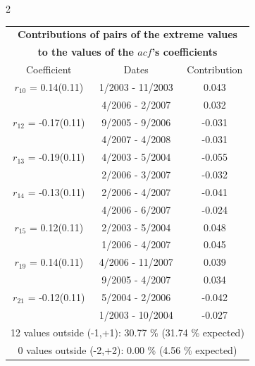 
\thispagestyle{empty}
\begin{multicols}{2}{ 
\begin{tabular}{ccc}
\multicolumn{3}{c}{\textbf{Contributions of pairs of the extreme values} }  \vspace{-.10in}  \\ 
\multicolumn{3}{c}{ \textbf{to the values of the $acf$'s coefficients}} \\ 
\hline 
\hline                  Coefficient  &  Dates &  Contribution \\ 
\hline 
  $r_{10}$ = 0.14(0.11) &       1/2003 - 11/2003 &        0.043   \vspace{-.10in} \\  
&        4/2006 -  2/2007 &        0.032  \vspace{-.02in} \\ \hline 
  $r_{12}$ = -0.17(0.11) &       9/2005 -  9/2006 &       -0.031    \vspace{-.10in} \\ 
  &        4/2007 -  4/2008 &       -0.031  \vspace{-.02in}   \\ \hline 
    $r_{13}$ = -0.19(0.11) &       4/2003 -  5/2004 &       -0.055    \vspace{-.10in} \\ 
  &        2/2006 -  3/2007 &       -0.032  \vspace{-.02in}   \\ \hline 
    $r_{14}$ = -0.13(0.11) &       2/2006 -  4/2007 &       -0.041    \vspace{-.10in} \\ 
  &        4/2006 -  6/2007 &       -0.024  \vspace{-.02in}   \\ \hline 
    $r_{15}$ = 0.12(0.11) &       2/2003 -  5/2004 &        0.048   \vspace{-.10in} \\  
&        1/2006 -  4/2007 &        0.045  \vspace{-.02in} \\ \hline 
  $r_{19}$ = 0.14(0.11) &       4/2006 - 11/2007 &        0.039   \vspace{-.10in} \\  
&        9/2005 -  4/2007 &        0.034  \vspace{-.02in} \\ \hline 
  $r_{21}$ = -0.12(0.11) &       5/2004 -  2/2006 &       -0.042    \vspace{-.10in} \\ 
  &        1/2003 - 10/2004 &       -0.027  \vspace{-.02in}   \\ \hline 
  \multicolumn{3}{c}{              12 values outside (-1,+1): 30.77  \% (31.74  \% expected)}\vspace{-.10in} \\ 
\multicolumn{3}{c}{               0 values outside (-2,+2):  0.00 \%  (4.56 \% expected) } \\
 \end{tabular} \\ 
 } 
\end{multicols} 
